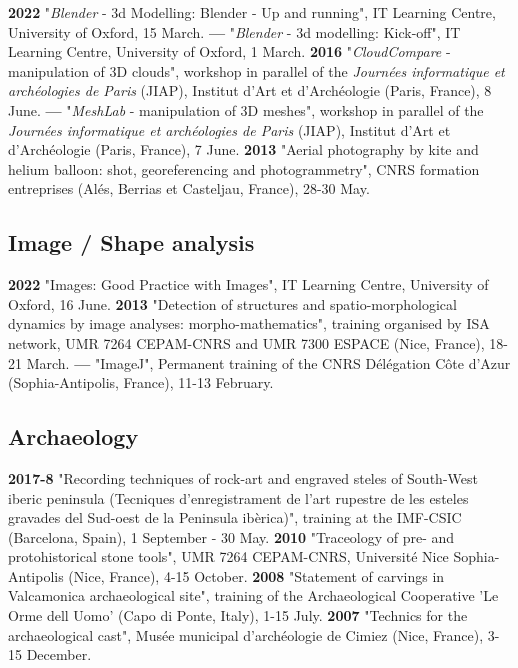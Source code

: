 \documentclass{article}
\begin{document}
\textbf{2022 }"\textit{Blender} - 3d Modelling: Blender - Up and running", IT Learning Centre, University of Oxford, 15 March.
\smallbreak
\textbf{--- }"\textit{Blender} - 3d modelling: Kick-off", IT Learning Centre, University of Oxford, 1 March.
\smallbreak
\textbf{2016 }"\textit{CloudCompare} - manipulation of 3D clouds", workshop in parallel of the \textit{Journ\'{e}es informatique et arch\'{e}ologies de Paris} (JIAP), Institut d'Art et d'Arch\'{e}ologie (Paris, France), 8 June.
\smallbreak
\textbf{--- }"\textit{MeshLab }- manipulation of 3D meshes", workshop in parallel of the \textit{Journ\'{e}es informatique et arch\'{e}ologies de Paris} (JIAP), Institut d'Art et d'Arch\'{e}ologie (Paris, France), 7 June.
\smallbreak
\textbf{2013 }"Aerial photography by kite and helium balloon: shot, georeferencing and photogrammetry", CNRS formation entreprises (Al\'{e}s, Berrias et Casteljau, France), 28-30 May.

\subsection*{Image / Shape analysis}

\textbf{2022 }"Images: Good Practice with Images", IT Learning Centre, University of Oxford, 16 June.
\smallbreak
\textbf{2013 }"Detection of structures and spatio-morphological dynamics by image analyses: morpho-mathematics", training organised by ISA network, UMR 7264 CEPAM-CNRS and UMR 7300 ESPACE (Nice, France), 18-21 March.
\smallbreak
\textbf{--- }"ImageJ", Permanent training of the CNRS D\'{e}l\'{e}gation C\^{o}te d'Azur (Sophia-Antipolis, France), 11-13 February.

\subsection*{Archaeology}

\textbf{2017-8 } "Recording techniques of rock-art and engraved steles of South-West iberic peninsula (Tecniques d'enregistrament de l'art rupestre de les esteles gravades del Sud-oest de la Peninsula ibèrica)", training at the IMF-CSIC (Barcelona, Spain), 1 September - 30 May.
\smallbreak
\textbf{2010 } "Traceology of pre- and protohistorical stone tools", UMR 7264 CEPAM-CNRS, Universit\'{e} Nice Sophia-Antipolis (Nice, France), 4-15 October.
\smallbreak
\textbf{2008 } "Statement of carvings in Valcamonica archaeological site", training of the Archaeological Cooperative 'Le Orme dell Uomo' (Capo di Ponte, Italy), 1-15 July.
\smallbreak
\textbf{2007 } "Technics for the archaeological cast", Mus\'{e}e municipal d'arch\'{e}ologie de Cimiez (Nice, France), 3-15 December.
\end{document}
